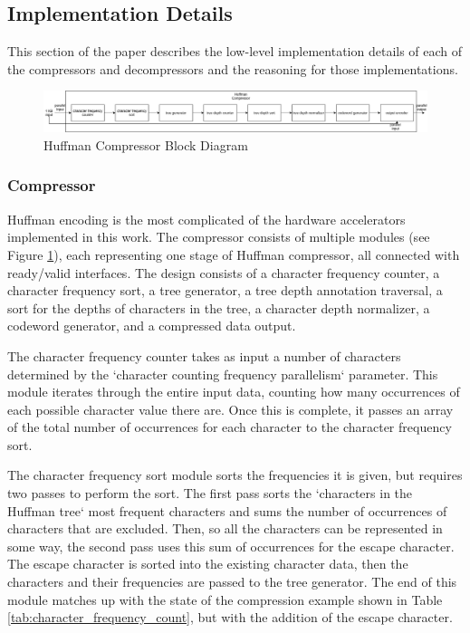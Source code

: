 \documentclass[doublespace,nopageskip]{VTthesis}
\begin{document}
\subsection{Implementation Details}\label{se:huffman_implementation_details}
This section of the paper describes the low-level implementation details of each of the compressors and decompressors and the reasoning for those implementations.

\begin{figure}[htb]
	\centering
	\includegraphics[scale=0.33]{Huffman Compressor Block Diagram.png}
	\caption{Huffman Compressor Block Diagram}
	\label{fig:huffman_compressor_block_diagram}
\end{figure}

\subsubsection{Compressor}\label{sss:huffman_compressor_implementation}
Huffman encoding is the most complicated of the hardware accelerators implemented in this work. The compressor consists of multiple modules (see Figure \ref{fig:huffman_compressor_block_diagram}), each representing one stage of Huffman compressor, all connected with ready/valid interfaces. The design consists of a character frequency counter, a character frequency sort, a tree generator, a tree depth annotation traversal, a sort for the depths of characters in the tree, a character depth normalizer, a codeword generator, and a compressed data output.

The character frequency counter takes as input a number of characters determined by the `character counting frequency parallelism` parameter. This module iterates through the entire input data, counting how many occurrences of each possible character value there are. Once this is complete, it passes an array of the total number of occurrences for each character to the character frequency sort.

The character frequency sort module sorts the frequencies it is given, but requires two passes to perform the sort. The first pass sorts the `characters in the Huffman tree` most frequent characters and sums the number of occurrences of characters that are excluded. Then, so all the characters can be represented in some way, the second pass uses this sum of occurrences for the escape character. The escape character is sorted into the existing character data, then the characters and their frequencies are passed to the tree generator. The end of this module matches up with the state of the compression example shown in Table \ref{tab:character_frequency_count}, but with the addition of the escape character. 
\end{document}
